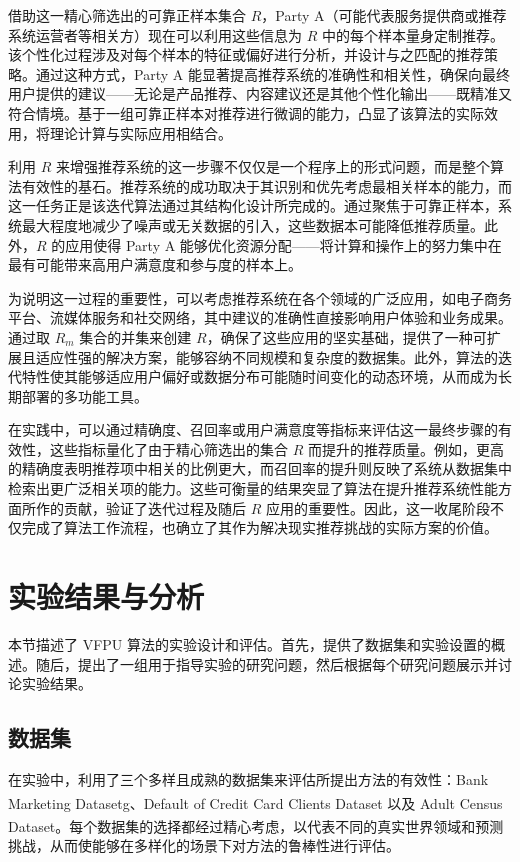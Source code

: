 借助这一精心筛选出的可靠正样本集合 $R$，Party A（可能代表服务提供商或推荐系统运营者等相关方）现在可以利用这些信息为 $R$ 中的每个样本量身定制推荐。该个性化过程涉及对每个样本的特征或偏好进行分析，并设计与之匹配的推荐策略。通过这种方式，Party A 能显著提高推荐系统的准确性和相关性，确保向最终用户提供的建议——无论是产品推荐、内容建议还是其他个性化输出——既精准又符合情境。基于一组可靠正样本对推荐进行微调的能力，凸显了该算法的实际效用，将理论计算与实际应用相结合。

利用 $R$ 来增强推荐系统的这一步骤不仅仅是一个程序上的形式问题，而是整个算法有效性的基石。推荐系统的成功取决于其识别和优先考虑最相关样本的能力，而这一任务正是该迭代算法通过其结构化设计所完成的。通过聚焦于可靠正样本，系统最大程度地减少了噪声或无关数据的引入，这些数据本可能降低推荐质量。此外，$R$ 的应用使得 Party A 能够优化资源分配——将计算和操作上的努力集中在最有可能带来高用户满意度和参与度的样本上。

为说明这一过程的重要性，可以考虑推荐系统在各个领域的广泛应用，如电子商务平台、流媒体服务和社交网络，其中建议的准确性直接影响用户体验和业务成果。通过取 ${{R}_{m}}$ 集合的并集来创建 $R$，确保了这些应用的坚实基础，提供了一种可扩展且适应性强的解决方案，能够容纳不同规模和复杂度的数据集。此外，算法的迭代特性使其能够适应用户偏好或数据分布可能随时间变化的动态环境，从而成为长期部署的多功能工具。

在实践中，可以通过精确度、召回率或用户满意度等指标来评估这一最终步骤的有效性，这些指标量化了由于精心筛选出的集合 $R$ 而提升的推荐质量。例如，更高的精确度表明推荐项中相关的比例更大，而召回率的提升则反映了系统从数据集中检索出更广泛相关项的能力。这些可衡量的结果突显了算法在提升推荐系统性能方面所作的贡献，验证了迭代过程及随后 $R$ 应用的重要性。因此，这一收尾阶段不仅完成了算法工作流程，也确立了其作为解决现实推荐挑战的实际方案的价值。  

\section{实验结果与分析}
本节描述了 VFPU 算法的实验设计和评估。首先，提供了数据集和实验设置的概述。随后，提出了一组用于指导实验的研究问题，然后根据每个研究问题展示并讨论实验结果。
\subsection{数据集}
在实验中，利用了三个多样且成熟的数据集来评估所提出方法的有效性：Bank Marketing Datasetg\textsuperscript{\cite{fitriani2021data}}、Default of Credit Card Clients Dataset\textsuperscript{\cite{subasi2019prediction}} 以及 Adult Census Dataset\textsuperscript{\cite{chakrabarty2018statistical}}。每个数据集的选择都经过精心考虑，以代表不同的真实世界领域和预测挑战，从而使能够在多样化的场景下对方法的鲁棒性进行评估。

